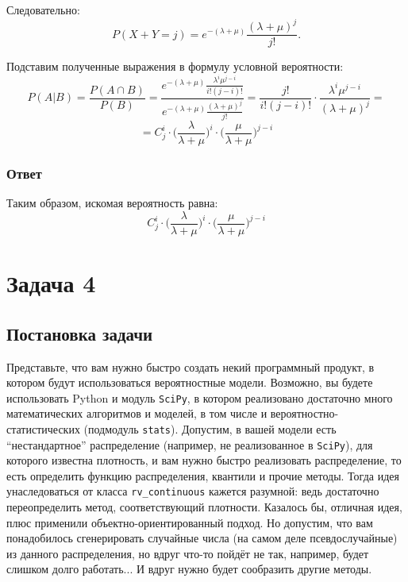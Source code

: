\documentclass[a4paper,14pt]{extarticle}
\begin{document}
            Следовательно:
            \[P(X+Y=j) = e^{-(\lambda + \mu)} \frac{(\lambda+\mu)^j}{j!}.\]
            
            Подставим полученные выражения в формулу условной вероятности:
            \[P(A|B) = \frac{P( A \cap B)}{P(B)} = \frac{e^{-(\lambda + \mu)} \frac{\lambda^i \mu^{j-i}}{i!(j-i)!}}{e^{-(\lambda + \mu)} \frac{(\lambda+\mu)^j}{j!}} = \frac{j!}{i!(j-i)!} \cdot \frac{\lambda^i \mu^{j-i}}{(\lambda+\mu)^j} =\]
            \[ = C_j^i \cdot \big(\frac{\lambda}{\lambda+\mu}\big)^i \cdot \big(\frac{\mu}{\lambda+\mu}\big)^{j-i}\]
            
            \subsubsection*{Ответ}
                
                Таким образом, искомая вероятность равна:
                \[
                    \boxed{C_j^i \cdot \big(\frac{\lambda}{\lambda+\mu}\big)^i \cdot \big(\frac{\mu}{\lambda+\mu}\big)^{j-i}}
                \]


    
    \section*{Задача 4}
        
        \subsection*{Постановка задачи}
            
            Представьте, что вам нужно быстро создать некий программный продукт, в котором будут использоваться вероятностные модели. Возможно, вы будете использовать Python и модуль \texttt{SciPy}, в котором реализовано достаточно много математических алгоритмов и моделей, в том числе и вероятностно-статистических (подмодуль \texttt{stats}). Допустим, в вашей модели есть ``нестандартное'' распределение (например, не реализованное в \texttt{SciPy}), для которого известна плотность, и вам нужно быстро реализовать распределение, то есть определить функцию распределения, квантили и прочие методы. Тогда идея унаследоваться от класса \texttt{rv\_continuous} кажется разумной: ведь достаточно переопределить метод, соответствующий плотности. Казалось бы, отличная идея, плюс применили объектно-ориентированный подход. Но допустим, что вам понадобилось сгенерировать случайные числа (на самом деле псевдослучайные) из данного распределения, но вдруг что-то пойдёт не так, например, будет слишком долго работать... И вдруг нужно будет сообразить другие методы.
            
\end{document}
